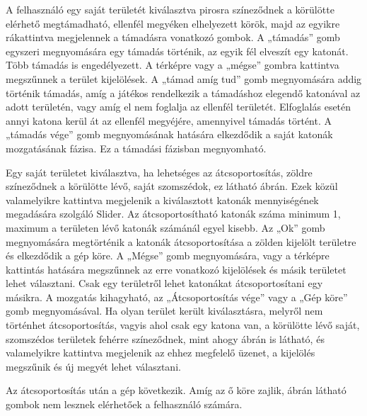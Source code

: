

A felhasználó egy saját területét kiválasztva pirosra színeződnek a körülötte elérhető megtámadható, ellenfél megyéken elhelyezett körök, majd az egyikre rákattintva megjelennek a támadásra vonatkozó gombok.
A „támadás” gomb egyszeri megnyomására egy támadás történik, az egyik fél elveszít egy katonát.
Több támadás is engedélyezett.
A térképre vagy a „mégse” gombra kattintva megszűnnek a terület kijelölések.
A „támad amíg tud” gomb megnyomására addig történik támadás, amíg a játékos rendelkezik a támadáshoz elegendő katonával az adott területén, vagy amíg el nem foglalja az ellenfél területét.
Elfoglalás esetén annyi katona kerül át az ellenfél megyéjére, amennyivel támadás történt.
A „támadás vége” gomb megnyomásának hatására elkezdődik a saját katonák mozgatásának fázisa.
Ez a támadási fázisban megnyomható. 


%




Egy saját területet kiválasztva, ha lehetséges az átcsoportosítás, zöldre színeződnek a körülötte lévő, saját szomszédok, ez látható  ábrán.
Ezek közül valamelyikre kattintva megjelenik a kiválasztott katonák mennyiségének megadására szolgáló Slider.
Az átcsoportosítható katonák száma minimum 1, maximum a területen lévő katonák számánál egyel kisebb.
Az „Ok” gomb megnyomására megtörténik a katonák átcsoportosítása a zölden kijelölt területre és elkezdődik a gép köre.
A „Mégse” gomb megnyomására, vagy a térképre kattintás hatására megszűnnek az erre vonatkozó kijelölések és másik területet lehet választani.
Csak egy területről lehet katonákat átcsoportosítani egy másikra.
A mozgatás kihagyható, az „Átcsoportosítás vége” vagy a „Gép köre” gomb megnyomásával.
Ha olyan terület került kiválasztásra, melyről nem történhet átcsoportosítás, vagyis ahol csak egy katona van, a körülötte lévő saját, szomszédos területek fehérre színeződnek, mint ahogy  ábrán is látható, és valamelyikre kattintva megjelenik az ehhez megfelelő üzenet, a kijelölés megszűnik és új megyét lehet választani.  

 


Az átcsoportosítás után a gép következik. Amíg az ő köre zajlik,  ábrán látható gombok nem lesznek elérhetőek a felhasználó számára.


